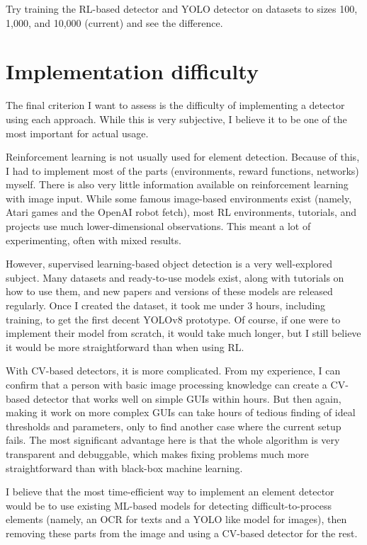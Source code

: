 \documentclass[
  digital,     %
  oneside,     %
  nosansbold,  %
  nocolorbold, %
  lof,         %
  lot,         %
]{fithesis4}
\begin{document}
Try training the RL-based detector and YOLO detector on datasets to sizes 100, 1,000, and 10,000 (current) and see the difference.


\section{Implementation difficulty}

The final criterion I want to assess is the difficulty of implementing a detector using each approach. While this is very subjective, I believe it to be one of the most important for actual usage.

Reinforcement learning is not usually used for element detection. Because of this, I had to implement most of the parts (environments, reward functions, networks) myself. There is also very little information available on reinforcement learning with image input. While some famous image-based environments exist (namely, Atari games and the OpenAI robot fetch), most RL environments, tutorials, and projects use much lower-dimensional observations. This meant a lot of experimenting, often with mixed results.

However, supervised learning-based object detection is a very well-explored subject. Many datasets and ready-to-use models exist, along with tutorials on how to use them, and new papers and versions of these models are released regularly. Once I created the dataset, it took me under 3 hours, including training, to get the first decent YOLOv8 prototype. Of course, if one were to implement their model from scratch, it would take much longer, but I still believe it would be more straightforward than when using RL.

With CV-based detectors, it is more complicated. From my experience, I can confirm that a person with basic image processing knowledge can create a CV-based detector that works well on simple GUIs within hours. But then again, making it work on more complex GUIs can take hours of tedious finding of ideal thresholds and parameters, only to find another case where the current setup fails. The most significant advantage here is that the whole algorithm is very transparent and debuggable, which makes fixing problems much more straightforward than with black-box machine learning.

I believe that the most time-efficient way to implement an element detector would be to use existing ML-based models for detecting difficult-to-process elements (namely, an OCR for texts and a YOLO like model for images), then removing these parts from the image and using a CV-based detector for the rest.
\end{document}
